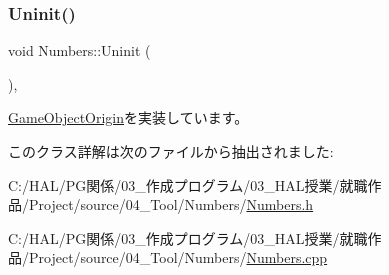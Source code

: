 \mbox{\label{class_numbers_aeaad3cc1b8ae7defe79813b983b04101}} 
\subsubsection{\texorpdfstring{Uninit()}{Uninit()}}
{\footnotesize\ttfamily void Numbers\+::\+Uninit (\begin{DoxyParamCaption}{ }\end{DoxyParamCaption})\hspace{0.3cm}{\ttfamily [override]}, {\ttfamily [virtual]}}



\mbox{\hyperlink{class_game_object_origin_aeac8fc4a1f625982313a9a60dd35d016}{Game\+Object\+Origin}}を実装しています。



このクラス詳解は次のファイルから抽出されました\+:\begin{DoxyCompactItemize}
\item 
C\+:/\+H\+A\+L/\+P\+G関係/03\+\_\+作成プログラム/03\+\_\+\+H\+A\+L授業/就職作品/\+Project/source/04\+\_\+\+Tool/\+Numbers/\mbox{\hyperlink{_numbers_8h}{Numbers.\+h}}\item 
C\+:/\+H\+A\+L/\+P\+G関係/03\+\_\+作成プログラム/03\+\_\+\+H\+A\+L授業/就職作品/\+Project/source/04\+\_\+\+Tool/\+Numbers/\mbox{\hyperlink{_numbers_8cpp}{Numbers.\+cpp}}\end{DoxyCompactItemize}
